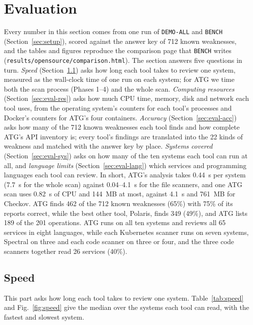\documentclass[conference]{IEEEtran}
\begin{document}
\section{Evaluation}\label{sec:eval}
Every number in this section comes from one run of \texttt{DEMO-ALL} and \texttt{BENCH} (Section~\ref{sec:setup}), scored against the answer key of 712 known weaknesses, and the tables and figures reproduce the comparison page that \texttt{BENCH} writes (\texttt{results/opensource/comparison.html}). The section answers five questions in turn. \textit{Speed} (Section~\ref{sec:eval-speed}) asks how long each tool takes to review one system, measured as the wall-clock time of one run on each system; for ATG we time both the scan process (Phases 1--4) and the whole scan. \textit{Computing resources} (Section~\ref{sec:eval-res}) asks how much CPU time, memory, disk and network each tool uses, from the operating system's counters for each tool's processes and Docker's counters for ATG's four containers. \textit{Accuracy} (Section~\ref{sec:eval-acc}) asks how many of the 712 known weaknesses each tool finds and how complete ATG's API inventory is; every tool's findings are translated into the 22 kinds of weakness and matched with the answer key by place. \textit{Systems covered} (Section~\ref{sec:eval-sys}) asks on how many of the ten systems each tool can run at all, and \textit{language limits} (Section~\ref{sec:eval-lang}) which services and programming languages each tool can review. In short, ATG's analysis takes 0.44~s per system (7.7~s for the whole scan) against 0.04--4.1~s for the file scanners, and one ATG scan uses 0.82~s of CPU and 144~MB at most, against 4.1~s and 761~MB for Checkov. ATG finds 462 of the 712 known weaknesses (65\%) with 75\% of its reports correct, while the best other tool, Polaris, finds 349 (49\%), and ATG lists 189 of the 201 operations. ATG runs on all ten systems and reviews all 65 services in eight languages, while each Kubernetes scanner runs on seven systems, Spectral on three and each code scanner on three or four, and the three code scanners together read 26 services (40\%).

\FloatBarrier
\subsection{Speed}\label{sec:eval-speed}
This part asks how long each tool takes to review one system. Table~\ref{tab:speed} and Fig.~\ref{fig:speed} give the median over the systems each tool can read, with the fastest and slowest system.
\end{document}
